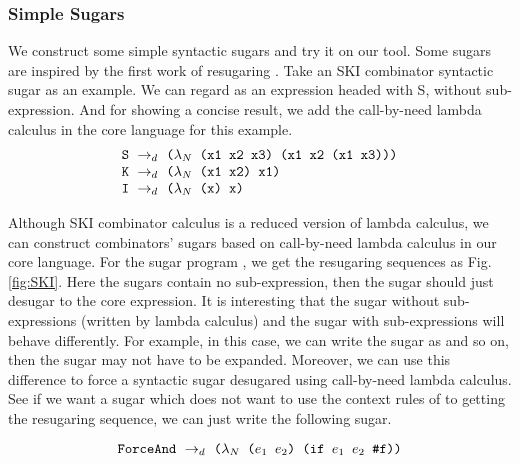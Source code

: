 \subsubsection{Simple Sugars}
\label{mark:simple}

We construct some simple syntactic sugars and try it on our tool. Some sugars are inspired by the first work of resugaring \cite{resugaring}. 
Take an SKI combinator syntactic sugar as an example. We can regard  as an expression headed with S, without sub-expression. And for showing a concise result, we add the call-by-need lambda calculus in the core language for this example.
\[
\begin{array}{l}
\mbox{\tt S} ~\rightarrow_d~ \texttt{($\lambda_N$ (x1 x2 x3) (x1 x2 (x1 x3)))}\\
\mbox{\tt K} ~\rightarrow_d~ \texttt{($\lambda_N$ (x1 x2) x1)}\\
\mbox{\tt I} ~\rightarrow_d~ \texttt{($\lambda_N$ (x) x)}
\end{array}
\]




Although SKI combinator calculus is a reduced version of lambda calculus, we can construct combinators' sugars based on call-by-need lambda calculus in our core language. For the sugar program , we get the resugaring sequences as Fig.  \ref{fig:SKI}. Here the sugars contain no sub-expression, then the sugar should just desugar to the core expression. It is interesting that the sugar without sub-expressions (written by lambda calculus) and the sugar with sub-expressions will behave differently. For example, in this case, we can write the sugar as  and so on, then the sugar may not have to be expanded. Moreover, we can use this difference to force a syntactic sugar desugared using call-by-need lambda calculus. See if we want a sugar  which does not
want to use the context rules of  to getting the resugaring sequence, we can just write the following sugar.

\[
\texttt{ForceAnd} ~\rightarrow_d~ \texttt{($\lambda_N$ ($e_1$ $e_2$) (if $e_1$ $e_2$ \#f))}
\]





